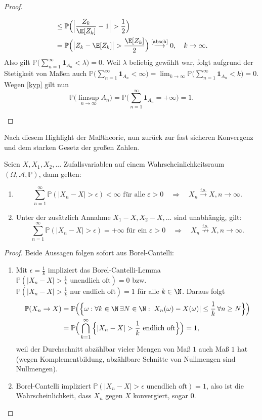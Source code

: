 \begin{proof}
\begin{enumerate}[label=(\roman*)]
\begin{align*}
			& \leq \mathbb{P}\Big(\Big|\frac{Z_k}{\E[Z_k]} - 1\Big| > \frac{1}{2}\Big)\\
		 	&= \mathbb{P}\Big(\big|Z_k - \E[Z_k]\big| > \frac{\E[Z_k]}{2}\Big) \overset{\text{\eqref{absch}}}{\longrightarrow} 0, \quad k \to \infty.
		 \end{align*}
		Also gilt $\mathbb{P}\big(\sum\limits_{n=1}^{\infty} \mathbf{1}_{A_n} < \lambda \big)=0$. Weil $\lambda$ beliebig gew\"ahlt war, folgt aufgrund der Stetigkeit von Ma\ss en auch $\mathbb{P}\big(\sum\limits_{n=1}^{\infty} \mathbf{1}_{A_n} < \infty \big)=\lim_{k\to\infty}\mathbb{P}\big(\sum\limits_{n=1}^{\infty} \mathbf{1}_{A_n} < k \big) =0$.	Wegen \eqref{kyp} gilt nun \[ \mathbb{P}\big(\limsup\limits_{n \to \infty}A_n\big) = \mathbb{P}\Big(\sum\limits_{n=1}^{\infty} \mathbf{1}_{A_n} = +\infty\Big) = 1. \]
	\end{enumerate}
\end{proof}
Nach diesem Highlight der Ma\ss theorie, nun zur\"uck zur fast sicheren Konvergenz und dem starken Gesetz der gro\ss en Zahlen. 
\begin{korollar}\label{ko}
	Seien $X, X_1, X_2, ...$ Zufallsvariablen auf einem Wahrscheinlichkeitsraum $(\Omega, \mathcal A, \mathbb P)$, dann gelten:
	\begin{enumerate}[label=(\roman*)]
		\item $$\sum_{n=1}^\infty \mathbb P(|X_n-X|>\epsilon)<\infty\text{  f\"ur alle }\varepsilon>0 \quad\Longrightarrow\quad X_n\overset{\text{f.s.}}{\to}X, n\to\infty.$$
		\item Unter der zus\"atzlich Annahme $X_1-X, X_2-X, ...$ sind unabh\"angig, gilt: $$\sum_{n=1}^\infty \mathbb P(|X_n-X|>\epsilon)=+\infty\text{ f\"ur ein }\varepsilon>0\quad \Longrightarrow\quad X_n\overset{\text{f.s.}}{\not\to}X, n\to\infty.$$
	\end{enumerate}
\end{korollar}
\begin{proof}
	Beide Aussagen folgen sofort aus Borel-Cantelli:
\begin{enumerate}[label=(\roman*)]
\item Mit $\epsilon=\frac 1 k$ impliziert das Borel-Cantelli-Lemma $\mathbb P(|X_n-X|>\frac 1 k\text{ unendlich oft})=0$ bzw. $\mathbb P(|X_n-X|>\frac 1 k\text{ nur endlich oft})=1$ f\"ur alle $k\in\N$. Daraus folgt
	\begin{align*}
		\mathbb P(X_n\to X)&=\mathbb P\Big(\Big\{\omega: \forall k \in \N\, \exists N\in \N: |X_n(\omega)-X(\omega)|\leq \frac{1}{k}\, \forall n\geq N\Big\}\Big)\\
		&=\mathbb P\Big( \bigcap_{k=1}^\infty \Big\{ |X_n-X|>\frac{1}{k}\text{ endlich oft}\Big\}\Big)=1,
	\end{align*}
	weil der Durchschnitt abz\"ahlbar vieler Mengen von Ma\ss{} $1$ auch Ma\ss{} $1$ hat (wegen Komplementbildung, abz\"ahlbare Schnitte von Nullmengen sind Nullmengen).
\item Borel-Cantelli impliziert $\mathbb P(|X_n-X|>\epsilon\text{ unendlich oft})=1$, also ist die Wahrscheinlichkeit, dass $X_n$ gegen $X$ konvergiert, sogar $0$.
\end{enumerate}
\end{proof}
